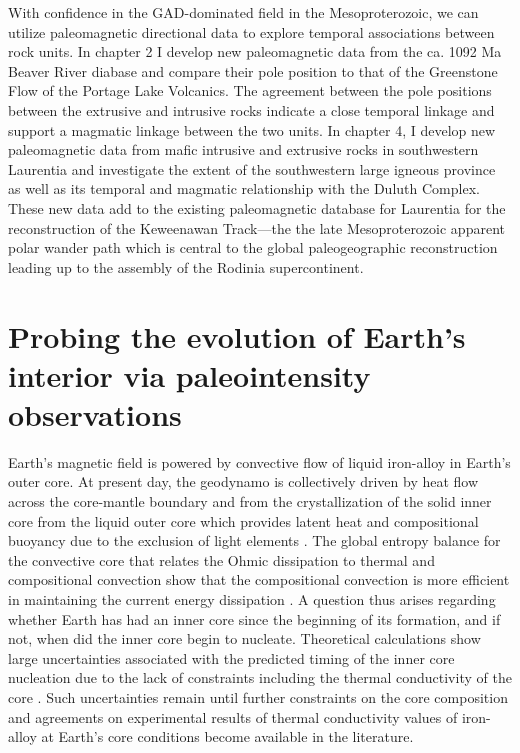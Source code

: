 With confidence in the GAD-dominated field in the Mesoproterozoic, we can utilize paleomagnetic directional data to explore temporal associations between rock units. In chapter 2 I develop new paleomagnetic data from the ca. 1092 Ma Beaver River diabase and compare their pole position to that of the Greenstone Flow of the Portage Lake Volcanics. The agreement between the pole positions between the extrusive and intrusive rocks indicate a close temporal linkage and support a magmatic linkage between the two units. In chapter 4, I develop new paleomagnetic data from mafic intrusive and extrusive rocks in southwestern Laurentia and investigate the extent of the southwestern large igneous province as well as its temporal and magmatic relationship with the Duluth Complex. These new data add to the existing paleomagnetic database for Laurentia for the reconstruction of the Keweenawan Track---the the late Mesoproterozoic apparent polar wander path which is central to the global paleogeographic reconstruction  leading up to the assembly of the Rodinia supercontinent. 

\section{Probing the evolution of Earth's interior via paleointensity observations}

Earth's magnetic field is powered by convective flow of liquid iron-alloy in Earth's outer core. At present day, the geodynamo is collectively driven by heat flow across the core-mantle boundary and from the crystallization of the solid inner core from the liquid outer core which provides latent heat and compositional buoyancy due to the exclusion of light elements \citep{Buffett2000a}. The global entropy balance for the convective core that relates the Ohmic dissipation to thermal and compositional convection show that the compositional convection is more efficient in maintaining the current energy dissipation \citep{Labrosse2003a, Landeau2022a}. A question thus arises regarding whether Earth has had an inner core since the beginning of its formation, and if not, when did the inner core begin to nucleate. Theoretical calculations show large uncertainties associated with the predicted timing of the inner core nucleation \citep[e.g.][]{Buffett2003a, Pozzo2012a, Nimmo2015a} due to the lack of constraints including the thermal conductivity of the core \citep{Gubbins2004a, Konopkova2016a, Ohta2016a}. Such uncertainties remain until further constraints on the core composition and agreements on experimental results of thermal conductivity values of iron-alloy at Earth's core conditions become available in the literature. 

